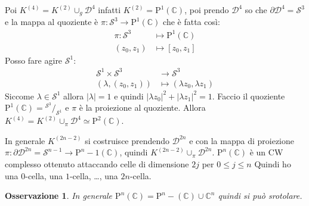 \documentclass[10pt, twoside=false, x11names]{scrbook}
\newtheorem{osservation}[theorem]{Osservazione}
\newcommand{\C}{\mathbb{C}}
\newcommand{\Pjc}[1]{\mathrm{P}^#1 (\mathbb{C})}
\newcommand{\Sph}[1][]{\mathcal{S}^#1}
\newcommand{\Disk}[1][]{\mathcal{D}^#1}
\newcommand*\quot[2]{{^{\textstyle #1}\big/_{\textstyle #2}}}
\begin{document}
Poi $ K^{(4)} = K^{(2)} \cup_g \Disk{4} $ infatti $ K^{(2)} = \Pjc{1} $, poi prendo $ \Disk{4} $
so che $ \partial \Disk{4} = \Sph{3} $ e la mappa al quoziente è $ \pi \colon \Sph{3} \to \Pjc{1} $
che è fatta così:
\begin{align*}
  \pi \colon \Sph{3} & \mapsto \Pjc{1} \\
  (z_0, z_1) & \mapsto [z_0, z_1]
\end{align*}
Posso fare agire $ \Sph{1} $:
\begin{align*}
  \Sph{1} \times \Sph{3} & \to \Sph{3} \\
  (\lambda, (z_0, z_1)) & \mapsto (\lambda z_0, \lambda z_1)
\end{align*}
Siccome $ \lambda \in \Sph{1} $ allora $ | \lambda | = 1 $ e quindi $ | \lambda z_0 |^2 + | \lambda z_1 |^2 = 1 $.
Faccio il quoziente $ \Pjc{1} = \quot{\Sph{3}}{\Sph{1}} $ e $ \pi $ è la proiezione al
quoziente. Allora $ K^{(4)} = K^{(2)} \cup_\pi \Disk{4} \simeq \Pjc{2} $.

In generale $ K^{(2n - 2)} $ si costruisce prendendo $ \Disk{2n} $ e con la mappa
di proiezione $ \pi \colon \partial \Disk{2n} = \Sph{n-1} \to \Pjc{n-1} $, quindi $ K^{(2n -2)} \cup_\pi \Disk{2n} $.
$ \Pjc{n} $ è un CW complesso ottenuto attaccando celle di dimensione $ 2j $ per $ 0 \leq j \leq n $
Quindi ho una $ 0 $-cella, una $ 1 $-cella, \dots, una $ 2n $-cella.

\begin{osservation}
  In generale $ \Pjc{n} = \Pjc{n-} \cup \C^n $ quindi si può srotolare.
\end{osservation}
\end{document}
